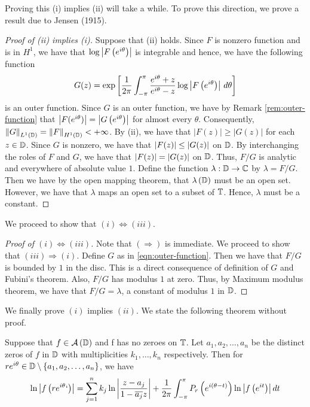 Proving this (i) implies (ii) will take a while. To prove this direction, we prove a result due to Jensen (1915).

\begin{proof}[Proof of (ii) implies (i)]
    Suppose that (ii) holds. Since $F$ is nonzero function and is in $H^{1}$, we have that $\log \left\lvert F\left( e^{i\theta} \right) \right\rvert$ is integrable and hence, we have the following function
\begin{equation}
    G(z) = \exp \left[ \frac{1}{2\pi} \int_{-\pi}^{\pi} \frac{e^{i\theta} + z}{e^{i\theta}-z} \log \left\lvert  F\left( e^{i\theta} \right) \right\rvert  \, d\theta
\right]   \label{eqn:outer-function}  \end{equation}
is an outer function. 
Since $G$ is an outer function, we have by Remark \ref{rem:outer-function} that $\left\lvert F(e^{i\theta}) \right\rvert = \left\lvert G\left( e^{i\theta} \right) \right\rvert$ for almost every $\theta$. Consequently, $\left\lVert G \right\rVert_{L^{1} \left( \mathbb D \right)} = \left\lVert F \right\rVert_{H^{1}\left( \mathbb D \right)} < +\infty$. By (ii), we have that $|F(z)| \ge |G(z)|$ for each $z\in \mathbb D$. Since $G$ is nonzero, we have that $\left\lvert F(z) \right\rvert\le \left\lvert G(z) \right\rvert$ on $\mathbb D$. By interchanging the roles of $F$ and $G$, we have that $\left\lvert F(z) \right\rvert=\left\lvert G(z) \right\rvert$ on $\mathbb D$. Thus, $F/G$ is analytic and everywhere of absolute value $1$. Define the function $\lambda : \mathbb D \to \mathbb C$ by $\lambda = F/G$. Then we have by the open mapping theorem, that $\lambda \left( \mathbb D \right)$ must be an open set. However, we have that $\lambda $ maps an open set to a subset of $\mathbb T$. Hence, $\lambda$ must be a constant.
\end{proof}

We proceed to show that $\left( i \right) \Leftrightarrow \left( iii \right)$.
\begin{proof}[Proof of $\left( i \right) \Leftrightarrow \left( iii \right)$]
    Note that $\left( \Rightarrow \right)$ is immediate. We proceed to show that $\left( iii \right) \Rightarrow \left( i \right)$. Define $G$ as in \ref{eqn:outer-function}. Then we have that $F/G$ is bounded by $1$ in the disc. This is a direct consequence of definition of $G$ and Fubini's theorem.
    Also, $F/G$ has modulus $1$ at zero. Thus, by Maximum modulus theorem, we have that $F/G=\lambda$, a constant of modulus $1$ in $\mathbb D$. 
\end{proof}

We finally prove $\left( i \right)$ implies $\left( ii \right)$. We state the following theorem without proof.
\begin{theorem}
    Suppose that $f \in {\cal A} \left( \mathbb D \right)$ and f has no zeroes on $\mathbb T$. Let $a_{1}, a_{2}, \ldots , a_{n}$ be the distinct zeros of $f$ in $\mathbb D$ with multiplicities $k_{1}, \ldots , k_{n}$ respectively. Then for $re^{i\theta}\in \mathbb D \setminus \left\{ a_{1}, a_{2}, \ldots , a_{n} \right\}$, we have 
    \begin{equation*}
	\ln \left\lvert f\left( re^{i\theta}` \right) \right\rvert = \sum_{j=1}^{n} k_{j} \ln \left\lvert \frac{z-a_{j}}{1-\overline{a_{j}}z} \right\rvert + \frac{1}{2\pi} \int_{-\pi}^{\pi} P_{r} \left( e^{i\left( \theta-t \right)}  \right) \ln \left\lvert f\left( e^{it} \right) \right\rvert dt
    \end{equation*}
    \label{thm:Poisson-Jensen}
\end{theorem}
